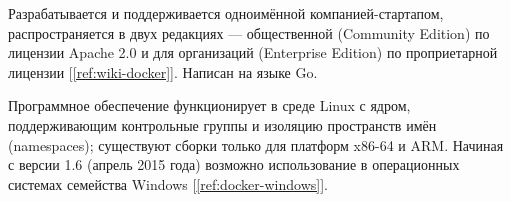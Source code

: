 Разрабатывается и поддерживается одноимённой компанией-стартапом,
распространяется в двух редакциях — общественной (Community Edition) по лицензии
Apache 2.0 и для организаций (Enterprise Edition) по проприетарной лицензии
[\ref{ref:wiki-docker}]. Написан на языке Go.

Программное обеспечение функционирует в среде Linux с ядром, поддерживающим
контрольные группы и изоляцию пространств имён (namespaces); существуют сборки
только для платформ x86-64 и ARM. Начиная с версии 1.6 (апрель 2015 года)
возможно использование в операционных системах семейства Windows
[\ref{ref:docker-windows}].
